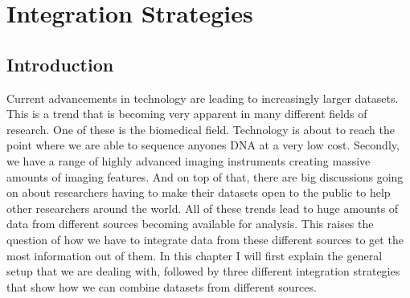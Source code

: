 \chapter{Integration Strategies}
\label{cha:integration}

\section{Introduction}
\label{sec:integration-introduction}
Current advancements in technology are leading to increasingly larger datasets. This is a trend that is becoming very apparent in many different fields of research. One of these is the biomedical field. Technology is about to reach the point where we are able to sequence anyones DNA at a very low cost. Secondly, we have a range of highly advanced imaging instruments creating massive amounts of imaging features. And on top of that, there are big discussions going on about researchers having to make their datasets open to the public to help other researchers around the world. All of these trends lead to huge amounts of data from different sources becoming available for analysis. This raises the question of how we have to integrate data from these different sources to get the most information out of them. In this chapter I will first explain the general setup that we are dealing with, followed by three different integration strategies that show how we can combine datasets from different sources.

